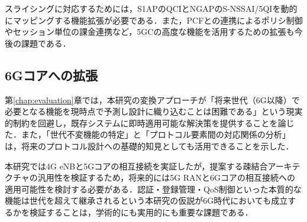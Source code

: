 スライシングに対応するためには，S1APのQCIとNGAPのS-NSSAI/5QIを動的にマッピングする機能拡張が必要である．また，PCFとの連携によるポリシ制御やセッション単位の課金連携など，5GCの高度な機能を活用するための拡張も今後の課題である．
\subsection{6Gコアへの拡張}
第\ref{chap:evaluation}章では，本研究の変換アプローチが「将来世代（6G以降）で必要となる機能を現時点で予測し設計に織り込むことは困難である」という現実的制約を回避し，既存システムに即時適用可能な解決策を提供することを論じた．また，「世代不変機能の特定」と「プロトコル要素間の対応関係の分析」は，将来のプロトコル設計への基礎的知見としても活用できることを示した．

本研究では4G eNBと5Gコアの相互接続を実証したが，提案する疎結合アーキテクチャの汎用性を検証するため，将来的には5G RANと6Gコアの相互接続への適用可能性を検討する必要がある．認証・登録管理・QoS制御といった本質的な機能は世代を超えて継承されるという本研究の仮説が6G時代においても成立するかを検証することは，学術的にも実用的にも重要な課題である．
